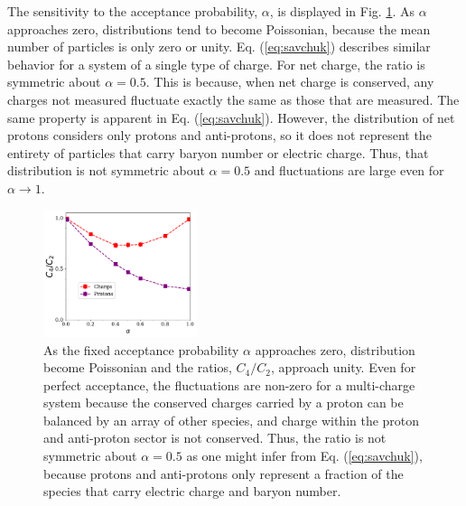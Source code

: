 The sensitivity to the acceptance probability, $\alpha$, is displayed in Fig. \ref{fig:uniform_vs_alpha}. As $\alpha$ approaches zero, distributions tend to become Poissonian, because the mean number of particles is only zero or unity. Eq. (\ref{eq:savchuk}) describes similar behavior for a system of a single type of charge. For net charge, the ratio is symmetric about $\alpha=0.5$. This is because, when net charge is conserved, any charges not measured fluctuate exactly the same as those that are measured. The same property is apparent in Eq. (\ref{eq:savchuk}). However, the distribution of net protons considers only protons and anti-protons, so it does not represent the entirety of particles that carry baryon number or electric charge. Thus, that distribution is not symmetric about $\alpha=0.5$ and fluctuations are large even for $\alpha \rightarrow 1$.
\begin{figure}
\centerline{\includegraphics[width=0.4\textwidth]{figs/m_vs_alpha}}
\caption{\label{fig:uniform_vs_alpha}
As the fixed acceptance probability $\alpha$ approaches zero, distribution become Poissonian and the ratios, $C_4/C_2$, approach unity. Even for perfect acceptance, the fluctuations are non-zero for a multi-charge system because the conserved charges carried by a proton can be balanced by an array of other species, and charge within the proton and anti-proton sector is not conserved. Thus, the ratio is not symmetric about $\alpha=0.5$ as one might infer from Eq. (\ref{eq:savchuk}), because protons and anti-protons only represent a fraction of the species that carry electric charge and baryon number.}
\end{figure}

